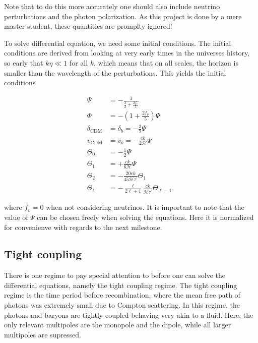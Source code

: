 \documentclass[12pt]{article}
\begin{document}
Note that to do this more accurately one should also include neutrino perturbations and the photon polarization. As this project is done by a mere master student, these quantities are promplty ignored!

To solve differential equation, we need some initial conditions. The initial conditions are derived from looking at very early times in the universes history, so early that $k\eta \ll 1$ for all $k$, which means that on all scales, the horizon is smaller than the wavelength of the perturbations. This yields the initial conditions

\begin{equation}\begin{aligned}\label{eq initial conditions}
    \Psi &=-\frac{1}{\frac{3}{2}+\frac{2 f_{v}}{5}} \\
    \Phi &=-\left(1+\frac{2 f_{\nu}}{5}\right) \Psi \\
    \delta_{\mathrm{CDM}} &=\delta_{b}=-\frac{3}{2} \Psi \\
    v_{\mathrm{CDM}} &=v_{b}=-\frac{c k}{2 \mathcal{H}} \Psi \\
    \Theta_{0} &=-\frac{1}{2} \Psi \\
    \Theta_{1} &=+\frac{c k}{6 \mathcal{H}} \Psi \\
    \Theta_{2} &= -\frac{20 c k}{45 \mathcal{H} \tau^{\prime}} \Theta_{1}\\
    \Theta_{\ell}&=-\frac{\ell}{2 \ell+1} \frac{c k}{\mathcal{H} \tau^{\prime}} \Theta_{\ell-1},
    \end{aligned}\end{equation}

where $f_v=0$ when not considering neutrinos. It is important to note that the value of $\Psi$ can be chosen freely when solving the equations. Here it is normalized for convenienve with regards to the next milestone.

\subsection{Tight coupling}
There is one regime to pay special attention to before one can solve the differential equations, namely the tight coupling regime. The tight coupling regime is the time period before recombination, where the mean free path of photons was extremely small due to Compton scattering. In this regime, the photons and baryons are tightly coupled behaving very akin to a fluid. Here, the only relevant multipoles are the monopole and the dipole, while all larger multipoles are supressed. 
\end{document}
